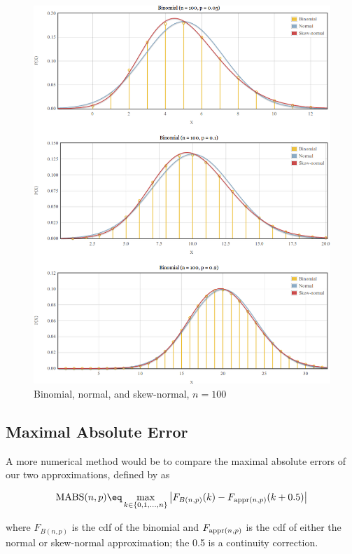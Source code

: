 \documentclass{article}
\begin{document}
\begin{figure}
  \centering
  \includegraphics[width=\textwidth]{../graphs/images/comparison-n100.png}
  \caption{Binomial, normal, and skew-normal, $n=100$}
  \label{fig:comparison-n100}
\end{figure}

\subsection{Maximal Absolute Error}

A more numerical method would be to compare the maximal absolute errors of our
two approximations, defined by \citet{mabs} as

\begin{equation}
  \textnormal{MABS}(n, p) \eq \max_{k \in \{0, 1,...,n\}} \left| F_{B(n,p)} (k) -  F_{\textnormal{appr}(n,p)}(k + 0.5) \right|
\end{equation}

where $F_{B(n,p)}$ is the cdf of the binomial and $F_{\textnormal{appr}(n,p)}$
is the cdf of either the normal or skew-normal approximation; the 0.5 is a
continuity correction.
\end{document}
